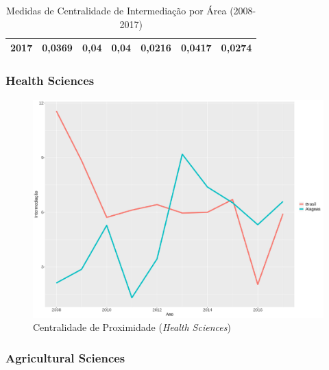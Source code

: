 \begin{table}[H]
\begin{tabular}{|c|l|l|l|l|l|l|}
		2017            & 0,0369                                                 & 0,04                                                    & 0,04                                                       & 0,0216                                                    & 0,0417                                                      & 0,0274                                                      \\ \hline
	\end{tabular}
\caption{Medidas de Centralidade de Intermediação por Área (2008-2017)}
\label{betweeness-tab}
\end{table}

\subsubsection{Health Sciences}

\begin{figure}[H]
	\centering
	\includegraphics[scale=0.4]{Imagens/graf-linha-betweeness-br-al.pdf}
	\caption{Centralidade de Proximidade (\textit{Health Sciences})}
	\label{between-health}
\end{figure}

\subsubsection{Agricultural Sciences}

